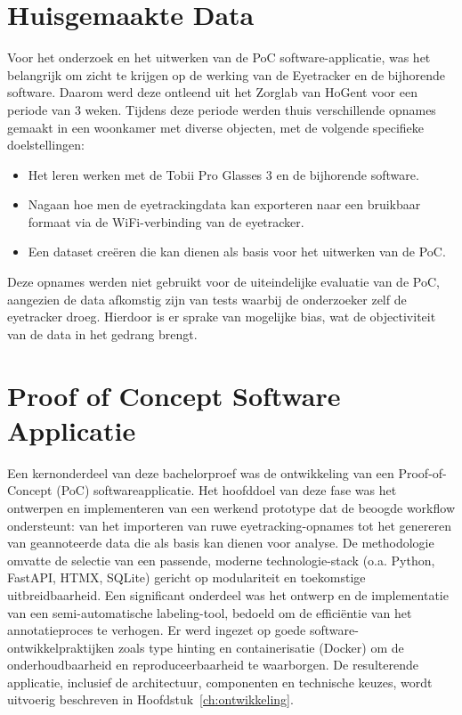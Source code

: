 \section{Huisgemaakte Data}

Voor het onderzoek en het uitwerken van de PoC software-applicatie, was het belangrijk om zicht te krijgen op de werking van de Eyetracker en de bijhorende software.
Daarom werd deze ontleend uit het Zorglab van HoGent voor een periode van 3 weken. 
Tijdens deze periode werden thuis verschillende opnames gemaakt in een woonkamer met diverse objecten, met de volgende specifieke doelstellingen:
\begin{itemize}
    \item Het leren werken met de Tobii Pro Glasses 3 en de bijhorende software.
    \item Nagaan hoe men de eyetrackingdata kan exporteren naar een bruikbaar formaat via de WiFi-verbinding van de eyetracker.
    \item Een dataset creëren die kan dienen als basis voor het uitwerken van de PoC.
\end{itemize}
Deze opnames werden niet gebruikt voor de uiteindelijke evaluatie van de PoC, aangezien de data afkomstig zijn van tests waarbij de onderzoeker zelf de eyetracker droeg.
Hierdoor is er sprake van mogelijke bias, wat de objectiviteit van de data in het gedrang brengt.

\section{Proof of Concept Software Applicatie}

Een kernonderdeel van deze bachelorproef was de ontwikkeling van een Proof-of-Concept (PoC) softwareapplicatie. 
Het hoofddoel van deze fase was het ontwerpen en implementeren van een werkend prototype dat de beoogde workflow ondersteunt: van het importeren van ruwe eyetracking-opnames tot het genereren van geannoteerde data die als basis kan dienen voor analyse. 
De methodologie omvatte de selectie van een passende, moderne technologie-stack (o.a. Python, FastAPI, HTMX, SQLite) gericht op modulariteit en toekomstige uitbreidbaarheid. 
Een significant onderdeel was het ontwerp en de implementatie van een semi-automatische labeling-tool, bedoeld om de efficiëntie van het annotatieproces te verhogen. 
Er werd ingezet op goede software-ontwikkelpraktijken zoals type hinting en containerisatie (Docker) om de onderhoudbaarheid en reproduceerbaarheid te waarborgen. 
De resulterende applicatie, inclusief de architectuur, componenten en technische keuzes, wordt uitvoerig beschreven in Hoofdstuk~\ref{ch:ontwikkeling}.

